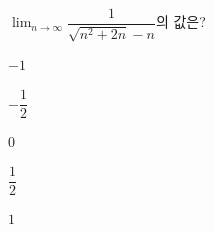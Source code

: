 $\displaystyle\lim_{n\to\infty}\dfrac{1}{\sqrt{n^2+2n}-n}$의 값은?
\begin{choices32}{\rule[-3ex]{0pt}{8ex}$-1$}{\rule[-3ex]{0pt}{8ex}$-\dfrac{1}{2}$}{\rule[-3ex]{0pt}{8ex}$0$}{\rule[-3ex]{0pt}{8ex}$\dfrac{1}{2}$}{\rule[-3ex]{0pt}{8ex}$1$}\end{choices32}
